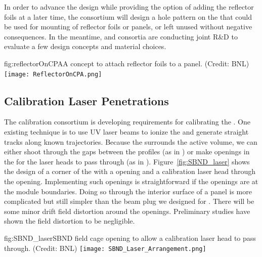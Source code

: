 In order to advance the  design while providing the option of adding the reflector foils at a later time, the  consortium will design %
a hole pattern 
on the %
 that could be used for mounting of reflector foils or panels, or left unused without negative consequences. In the meantime,  and  consortia are conducting joint R\&D to evaluate a few design concepts and material choices. 


\begin{dunefigure}{fig:reflectorOnCPA}{A concept to attach reflector foils to a  panel. (Credit: BNL)}
\texttt{[image: ReflectorOnCPA.png]}
\end{dunefigure}

\subsection{Calibration Laser Penetrations}
\label{sec:fdsp-hv-app-alt-cal}

The calibration consortium is developing requirements for calibrating the  \efield.  One existing technique is to use UV laser beams to ionize the  and generate straight tracks along known trajectories.  Because the  surrounds the  active volume, we can either shoot through the gaps between the  profiles (as in ) or make openings in the  for the laser heads to pass through (as in ). Figure~\ref{fig:SBND_laser}  shows the design of a corner of the   with a   opening and a calibration laser head through the opening.  Implementing such openings is straightforward if the openings are at the   module boundaries.  Doing so through the interior surface of a  panel is more complicated but still simpler than the beam plug we designed for .  There will be some minor drift field distortion around the openings.  Preliminary  studies have shown the field distortion to be negligible. 

\begin{dunefigure}{fig:SBND_laser}{SBND field cage opening to allow a calibration laser head to pass through. (Credit: BNL)}
\texttt{[image: SBND\_Laser\_Arrangement.png]}
\end{dunefigure}


